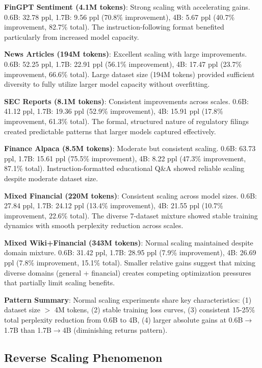 \textbf{FinGPT Sentiment (4.1M tokens)}: Strong scaling with accelerating gains. 0.6B: 32.78 ppl, 1.7B: 9.56 ppl (70.8\% improvement), 4B: 5.67 ppl (40.7\% improvement, 82.7\% total). The instruction-following format benefited particularly from increased model capacity.

\textbf{News Articles (194M tokens)}: Excellent scaling with large improvements. 0.6B: 52.25 ppl, 1.7B: 22.91 ppl (56.1\% improvement), 4B: 17.47 ppl (23.7\% improvement, 66.6\% total). Large dataset size (194M tokens) provided sufficient diversity to fully utilize larger model capacity without overfitting.

\textbf{SEC Reports (8.1M tokens)}: Consistent improvements across scales. 0.6B: 41.12 ppl, 1.7B: 19.36 ppl (52.9\% improvement), 4B: 15.91 ppl (17.8\% improvement, 61.3\% total). The formal, structured nature of regulatory filings created predictable patterns that larger models captured effectively.

\textbf{Finance Alpaca (8.5M tokens)}: Moderate but consistent scaling. 0.6B: 63.73 ppl, 1.7B: 15.61 ppl (75.5\% improvement), 4B: 8.22 ppl (47.3\% improvement, 87.1\% total). Instruction-formatted educational Q\&A showed reliable scaling despite moderate dataset size.

\textbf{Mixed Financial (220M tokens)}: Consistent scaling across model sizes. 0.6B: 27.84 ppl, 1.7B: 24.12 ppl (13.4\% improvement), 4B: 21.55 ppl (10.7\% improvement, 22.6\% total). The diverse 7-dataset mixture showed stable training dynamics with smooth perplexity reduction across scales.

\textbf{Mixed Wiki+Financial (343M tokens)}: Normal scaling maintained despite domain mixture. 0.6B: 31.42 ppl, 1.7B: 28.95 ppl (7.9\% improvement), 4B: 26.69 ppl (7.8\% improvement, 15.1\% total). Smaller relative gains suggest that mixing diverse domains (general + financial) creates competing optimization pressures that partially limit scaling benefits.

\textbf{Pattern Summary}: Normal scaling experiments share key characteristics: (1) dataset size $>$ 4M tokens, (2) stable training loss curves, (3) consistent 15-25\% total perplexity reduction from 0.6B to 4B, (4) larger absolute gains at 0.6B$\to$1.7B than 1.7B$\to$4B (diminishing returns pattern).

\subsection{Reverse Scaling Phenomenon}

